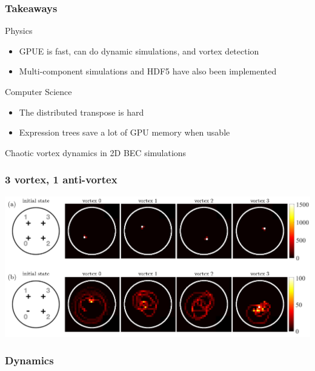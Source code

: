 \documentclass{beamer}
\begin{document}
\begin{frame}
\frametitle{Takeaways}

Physics
\begin{itemize}
\item GPUE is fast, can do dynamic simulations, and vortex detection
\item Multi-component simulations and HDF5 have also been implemented
\end{itemize}

Computer Science
\begin{itemize}
\item The distributed transpose is hard
\item Expression trees save a lot of GPU memory when usable
\end{itemize}
\end{frame}

\begin{frame}
\center \huge Chaotic vortex dynamics in 2D BEC simulations
\end{frame}

\begin{frame}
\frametitle{3 vortex, 1 anti-vortex}
\includegraphics[width=\textwidth]{../data/2d/histogram/histogram}

\end{frame}

\begin{frame}
\frametitle{Dynamics}

\end{frame}
\end{document}
